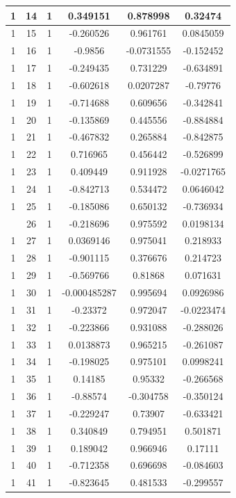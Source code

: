\documentclass[12pt,a4paper]{article}
\numberwithin{equation}{section}
\numberwithin{figure}{section}
\numberwithin{table}{section}
\begin{document}
\begin{longtable}{|c|c|c|c|c|c|}
1 & 14 & 1 & 0.349151 & 0.878998 & 0.32474 \\ \hline
1 & 15 & 1 & -0.260526 & 0.961761 & 0.0845059 \\ \hline
1 & 16 & 1 & -0.9856 & -0.0731555 & -0.152452 \\ \hline
1 & 17 & 1 & -0.249435 & 0.731229 & -0.634891 \\ \hline
1 & 18 & 1 & -0.602618 & 0.0207287 & -0.79776 \\ \hline
1 & 19 & 1 & -0.714688 & 0.609656 & -0.342841 \\ \hline
1 & 20 & 1 & -0.135869 & 0.445556 & -0.884884 \\ \hline
1 & 21 & 1 & -0.467832 & 0.265884 & -0.842875 \\ \hline
1 & 22 & 1 & 0.716965 & 0.456442 & -0.526899 \\ \hline
1 & 23 & 1 & 0.409449 & 0.911928 & -0.0271765 \\ \hline
1 & 24 & 1 & -0.842713 & 0.534472 & 0.0646042 \\ \hline
1 & 25 & 1 & -0.185086 & 0.650132 & -0.736934 \\ \hline
\pagebreak
1 & 26 & 1 & -0.218696 & 0.975592 & 0.0198134 \\ \hline
1 & 27 & 1 & 0.0369146 & 0.975041 & 0.218933 \\ \hline
1 & 28 & 1 & -0.901115 & 0.376676 & 0.214723 \\ \hline
1 & 29 & 1 & -0.569766 & 0.81868 & 0.071631 \\ \hline
1 & 30 & 1 & -0.000485287 & 0.995694 & 0.0926986 \\ \hline
1 & 31 & 1 & -0.23372 & 0.972047 & -0.0223474 \\ \hline
1 & 32 & 1 & -0.223866 & 0.931088 & -0.288026 \\ \hline
1 & 33 & 1 & 0.0138873 & 0.965215 & -0.261087 \\ \hline
1 & 34 & 1 & -0.198025 & 0.975101 & 0.0998241 \\ \hline
1 & 35 & 1 & 0.14185 & 0.95332 & -0.266568 \\ \hline
1 & 36 & 1 & -0.88574 & -0.304758 & -0.350124 \\ \hline
1 & 37 & 1 & -0.229247 & 0.73907 & -0.633421 \\ \hline
1 & 38 & 1 & 0.340849 & 0.794951 & 0.501871 \\ \hline
1 & 39 & 1 & 0.189042 & 0.966946 & 0.17111 \\ \hline
1 & 40 & 1 & -0.712358 & 0.696698 & -0.084603 \\ \hline
1 & 41 & 1 & -0.823645 & 0.481533 & -0.299557 \\ \hline

\end{longtable}
\end{document}
